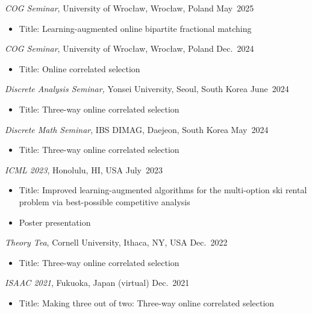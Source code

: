 \documentclass{article}
\newcommand{\killinitspace}{-0.7em}
\begin{document}
\textsl{COG Seminar}, University of Wrocław, Wrocław, Poland  \hfill May~2025
\vspace{\killinitspace}
\begin{itemize}
\item Title: Learning-augmented online bipartite fractional matching
\end{itemize}

\textsl{COG Seminar}, University of Wrocław, Wrocław, Poland  \hfill Dec.~2024
\vspace{\killinitspace}
\begin{itemize}
\item Title: Online correlated selection
\end{itemize}

\textsl{Discrete Analysis Seminar,} Yonsei University, Seoul, South Korea \hfill June~2024
\vspace{\killinitspace}
\begin{itemize}
\item Title: Three-way online correlated selection
\end{itemize}

\textsl{Discrete Math Seminar}, IBS DIMAG, Daejeon, South Korea \hfill May~2024
\vspace{\killinitspace}
\begin{itemize}
\item Title: Three-way online correlated selection
\end{itemize}

\textsl{ICML 2023}, Honolulu, HI, USA \hfill July~2023
\vspace{\killinitspace}
\begin{itemize}
\item Title: Improved learning-augmented algorithms for the multi-option ski rental problem via best-possible competitive analysis
\item Poster presentation
\end{itemize}

\textsl{Theory Tea}, Cornell University, Ithaca, NY, USA \hfill Dec.~2022
\vspace{\killinitspace}
\begin{itemize}
\item Title: Three-way online correlated selection
\end{itemize}

\textsl{ISAAC 2021}, Fukuoka, Japan (virtual) \hfill Dec.~2021
\vspace{\killinitspace}
\begin{itemize}
\item Title: Making three out of two: Three-way online correlated selection
\end{itemize}
\end{document}
